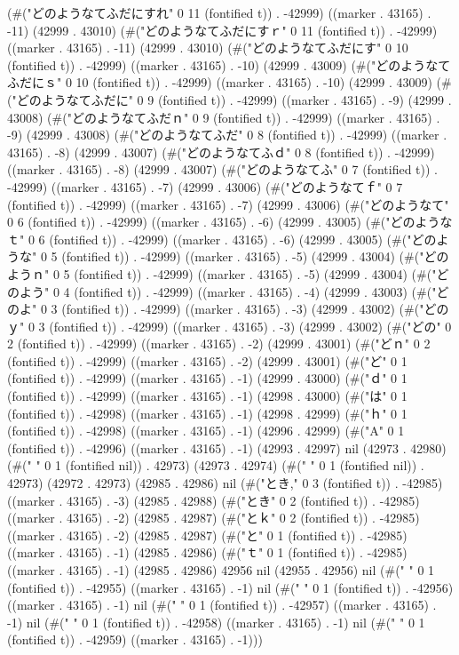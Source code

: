 (#("どのようなてふだにすれ" 0 11 (fontified t)) . -42999) ((marker . 43165) . -11) (42999 . 43010) (#("どのようなてふだにすｒ" 0 11 (fontified t)) . -42999) ((marker . 43165) . -11) (42999 . 43010) (#("どのようなてふだにす" 0 10 (fontified t)) . -42999) ((marker . 43165) . -10) (42999 . 43009) (#("どのようなてふだにｓ" 0 10 (fontified t)) . -42999) ((marker . 43165) . -10) (42999 . 43009) (#("どのようなてふだに" 0 9 (fontified t)) . -42999) ((marker . 43165) . -9) (42999 . 43008) (#("どのようなてふだｎ" 0 9 (fontified t)) . -42999) ((marker . 43165) . -9) (42999 . 43008) (#("どのようなてふだ" 0 8 (fontified t)) . -42999) ((marker . 43165) . -8) (42999 . 43007) (#("どのようなてふｄ" 0 8 (fontified t)) . -42999) ((marker . 43165) . -8) (42999 . 43007) (#("どのようなてふ" 0 7 (fontified t)) . -42999) ((marker . 43165) . -7) (42999 . 43006) (#("どのようなてｆ" 0 7 (fontified t)) . -42999) ((marker . 43165) . -7) (42999 . 43006) (#("どのようなて" 0 6 (fontified t)) . -42999) ((marker . 43165) . -6) (42999 . 43005) (#("どのようなｔ" 0 6 (fontified t)) . -42999) ((marker . 43165) . -6) (42999 . 43005) (#("どのような" 0 5 (fontified t)) . -42999) ((marker . 43165) . -5) (42999 . 43004) (#("どのようｎ" 0 5 (fontified t)) . -42999) ((marker . 43165) . -5) (42999 . 43004) (#("どのよう" 0 4 (fontified t)) . -42999) ((marker . 43165) . -4) (42999 . 43003) (#("どのよ" 0 3 (fontified t)) . -42999) ((marker . 43165) . -3) (42999 . 43002) (#("どのｙ" 0 3 (fontified t)) . -42999) ((marker . 43165) . -3) (42999 . 43002) (#("どの" 0 2 (fontified t)) . -42999) ((marker . 43165) . -2) (42999 . 43001) (#("どｎ" 0 2 (fontified t)) . -42999) ((marker . 43165) . -2) (42999 . 43001) (#("ど" 0 1 (fontified t)) . -42999) ((marker . 43165) . -1) (42999 . 43000) (#("ｄ" 0 1 (fontified t)) . -42999) ((marker . 43165) . -1) (42998 . 43000) (#("は" 0 1 (fontified t)) . -42998) ((marker . 43165) . -1) (42998 . 42999) (#("ｈ" 0 1 (fontified t)) . -42998) ((marker . 43165) . -1) (42996 . 42999) (#("A" 0 1 (fontified t)) . -42996) ((marker . 43165) . -1) (42993 . 42997) nil (42973 . 42980) (#(" " 0 1 (fontified nil)) . 42973) (42973 . 42974) (#(" " 0 1 (fontified nil)) . 42973) (42972 . 42973) (42985 . 42986) nil (#("とき," 0 3 (fontified t)) . -42985) ((marker . 43165) . -3) (42985 . 42988) (#("とき" 0 2 (fontified t)) . -42985) ((marker . 43165) . -2) (42985 . 42987) (#("とｋ" 0 2 (fontified t)) . -42985) ((marker . 43165) . -2) (42985 . 42987) (#("と" 0 1 (fontified t)) . -42985) ((marker . 43165) . -1) (42985 . 42986) (#("ｔ" 0 1 (fontified t)) . -42985) ((marker . 43165) . -1) (42985 . 42986) 42956 nil (42955 . 42956) nil (#("
" 0 1 (fontified t)) . -42955) ((marker . 43165) . -1) nil (#(" " 0 1 (fontified t)) . -42956) ((marker . 43165) . -1) nil (#(" " 0 1 (fontified t)) . -42957) ((marker . 43165) . -1) nil (#(" " 0 1 (fontified t)) . -42958) ((marker . 43165) . -1) nil (#(" " 0 1 (fontified t)) . -42959) ((marker . 43165) . -1)))
